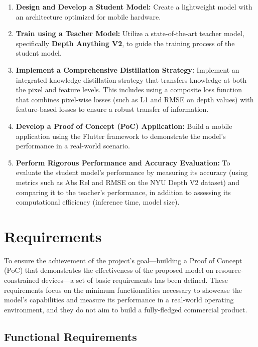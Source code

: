 \begin{enumerate}
    \item \textbf{Design and Develop a Student Model:} Create a lightweight model with an architecture optimized for mobile hardware.
    
    \item \textbf{Train using a Teacher Model:} Utilize a state-of-the-art teacher model, specifically \textbf{Depth Anything V2}, to guide the training process of the student model.
    
    \item \textbf{Implement a Comprehensive Distillation Strategy:} Implement an integrated knowledge distillation strategy that transfers knowledge at both the pixel and feature levels. This includes using a composite loss function that combines pixel-wise losses (such as L1 and RMSE on depth values) with feature-based losses to ensure a robust transfer of information.
    
    \item \textbf{Develop a Proof of Concept (PoC) Application:} Build a mobile application using the Flutter framework to demonstrate the model's performance in a real-world scenario.
    
    \item \textbf{Perform Rigorous Performance and Accuracy Evaluation:} To evaluate the student model's performance by measuring its accuracy (using metrics such as Abs Rel and RMSE on the NYU Depth V2 dataset) and comparing it to the teacher's performance, in addition to assessing its computational efficiency (inference time, model size).
\end{enumerate}

\section{Requirements}
\label{sec:requirements}

To ensure the achievement of the project's goal—building a Proof of Concept (PoC) that demonstrates the effectiveness of the proposed model on resource-constrained devices—a set of basic requirements has been defined. These requirements focus on the minimum functionalities necessary to showcase the model's capabilities and measure its performance in a real-world operating environment, and they do not aim to build a fully-fledged commercial product.

\subsection{Functional Requirements}
\label{subsec:functional_reqs}

